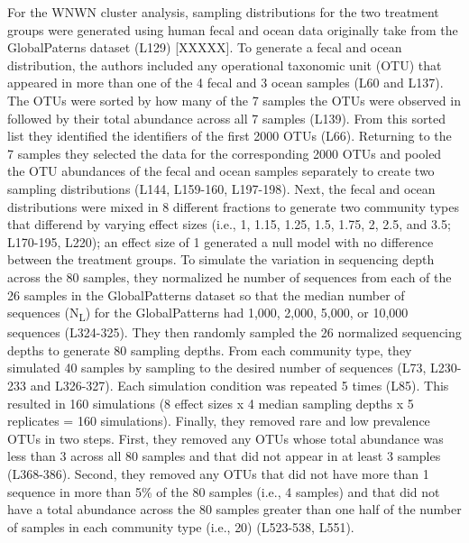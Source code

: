 \documentclass[
]{article}
\begin{document}
For the WNWN cluster analysis, sampling distributions for the two
treatment groups were generated using human fecal and ocean data
originally take from the GlobalPaterns dataset (L129) {[}XXXXX{]}. To
generate a fecal and ocean distribution, the authors included any
operational taxonomic unit (OTU) that appeared in more than one of the 4
fecal and 3 ocean samples (L60 and L137). The OTUs were sorted by how
many of the 7 samples the OTUs were observed in followed by their total
abundance across all 7 samples (L139). From this sorted list they
identified the identifiers of the first 2000 OTUs (L66). Returning to
the 7 samples they selected the data for the corresponding 2000 OTUs and
pooled the OTU abundances of the fecal and ocean samples separately to
create two sampling distributions (L144, L159-160, L197-198). Next, the
fecal and ocean distributions were mixed in 8 different fractions to
generate two community types that differend by varying effect sizes
(i.e., 1, 1.15, 1.25, 1.5, 1.75, 2, 2.5, and 3.5; L170-195, L220); an
effect size of 1 generated a null model with no difference between the
treatment groups. To simulate the variation in sequencing depth across
the 80 samples, they normalized he number of sequences from each of the
26 samples in the GlobalPatterns dataset so that the median number of
sequences (N\textsubscript{L}) for the GlobalPatterns had 1,000, 2,000,
5,000, or 10,000 sequences (L324-325). They then randomly sampled the 26
normalized sequencing depths to generate 80 sampling depths. From each
community type, they simulated 40 samples by sampling to the desired
number of sequences (L73, L230-233 and L326-327). Each simulation
condition was repeated 5 times (L85). This resulted in 160 simulations
(8 effect sizes x 4 median sampling depths x 5 replicates = 160
simulations). Finally, they removed rare and low prevalence OTUs in two
steps. First, they removed any OTUs whose total abundance was less than
3 across all 80 samples and that did not appear in at least 3 samples
(L368-386). Second, they removed any OTUs that did not have more than 1
sequence in more than 5\% of the 80 samples (i.e., 4 samples) and that
did not have a total abundance across the 80 samples greater than one
half of the number of samples in each community type (i.e., 20)
(L523-538, L551).
\end{document}
